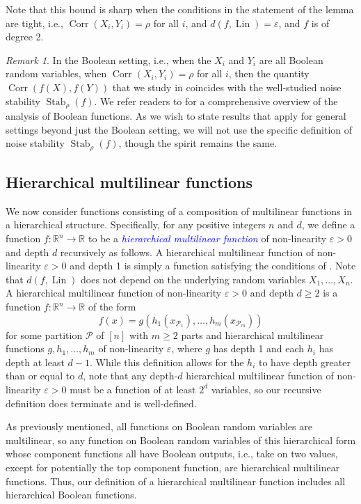 \documentclass[12pt,letterpaper]{amsart}
\newcommand{\dfn}[1]{\textcolor{blue}{\emph{#1}}}
\def\R{\mathbb{R}}
\def\Corr{\operatorname{Corr}}
\def\Lin{\operatorname{Lin}}
\newcommand{\mc}[1]{\mathcal{#1}}
\newcommand{\1}[1]{1_{\left\{#1\right\}}}
\theoremstyle{definition}
\theoremstyle{remark}
\newtheorem{remark}[theorem]{Remark}
\begin{document}
Note that this bound is sharp when the conditions in the statement of the lemma are tight, i.e., $\Corr(X_i,Y_i)=\rho$ for all $i$, and $d(f,\Lin)=\varepsilon$, and $f$ is of degree 2.
\begin{remark}\label{remark:noise_stability}
    In the Boolean setting, i.e., when the $X_i$ and $Y_i$ are all Boolean random variables, when $\Corr(X_i,Y_i)=\rho$ for all $i$, then the quantity $\Corr(f(X),f(Y))$ that we study in  coincides with the well-studied noise stability $\operatorname{Stab}_\rho(f)$.
    We refer readers to \cite{ODonnell:14} for a comprehensive overview of the analysis of Boolean functions.
    As we wish to state results that apply for general settings beyond just the Boolean setting, we will not use the specific definition of noise stability $\operatorname{Stab}_\rho(f)$, though the spirit remains the same. 
\end{remark}
\subsection{Hierarchical multilinear functions}\label{subsec:hierarchical_multilinear}
We now consider functions consisting of a composition of multilinear functions in a hierarchical structure.
Specifically, for any positive integers $n$ and $d$, we define a function $f:\R^n\to\R$ to be a \dfn{hierarchical multilinear function} of non-linearity $\varepsilon>0$ and depth $d$ recursively as follows.
A hierarchical multilinear function of non-linearity $\varepsilon>0$ and depth 1 is simply a function satisfying the conditions of .
Note that $d(f,\Lin)$ does not depend on the underlying random variables $X_1,\dots,X_n$.
A hierarchical multilinear function of non-linearity $\varepsilon>0$ and depth $d\geq2$ is a function $f:\R^n\to\R$ of the form
\[ f(x) = g(h_1(x_{\mc P_1}),\dots,h_m(x_{\mc P_m}))\]
for some partition $\mc P$ of $[n]$ with $m\geq 2$ parts and hierarchical multilinear functions $g,h_1,\dots,h_m$ of non-linearity $\varepsilon$, where $g$ has depth 1 and each $h_i$ has depth at least $d-1$.
While this definition allows for the $h_i$ to have depth greater than or equal to $d$, note that any depth-$d$ hierarchical multilinear function of non-linearity $\varepsilon>0$ must be a function of at least $2^d$ variables, so our recursive definition does terminate and is well-defined.

As previously mentioned, all functions on Boolean random variables are multilinear, so any function on Boolean random variables of this hierarchical form whose component functions all have Boolean outputs, i.e., take on two values, except for potentially the top component function, are hierarchical multilinear functions.
Thus, our definition of a hierarchical multilinear function includes all hierarchical Boolean functions.
\end{document}
